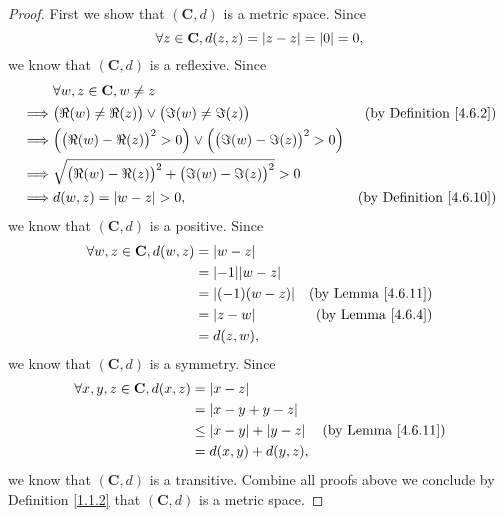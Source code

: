 \begin{proof}
    First we show that \((\mathbf{C}, d)\) is a metric space.
    Since
    \[
        \forall z \in \mathbf{C}, d(z, z) = \abs*{z - z} = \abs*{0} = 0,
    \]
    we know that \((\mathbf{C}, d)\) is a reflexive.
    Since
    \begin{align*}
                 & \forall w, z \in \mathbf{C}, w \neq z                                                                                          \\
        \implies & \big(\Re(w) \neq \Re(z)\big) \lor \big(\Im(w) \neq \Im(z)\big)                           & \text{(by Definition \ref{4.6.2})}  \\
        \implies & \Big(\big(\Re(w) - \Re(z)\big)^2 > 0\Big) \lor \Big(\big(\Im(w) - \Im(z)\big)^2 > 0\Big)                                       \\
        \implies & \sqrt{\big(\Re(w) - \Re(z)\big)^2 + \big(\Im(w) - \Im(z)\big)^2} > 0                                                           \\
        \implies & d(w, z) = \abs*{w - z} > 0,                                                              & \text{(by Definition \ref{4.6.10})}
    \end{align*}
    we know that \((\mathbf{C}, d)\) is a positive.
    Since
    \begin{align*}
        \forall w, z \in \mathbf{C}, d(w, z) & = \abs*{w - z}                                            \\
                                             & = \abs*{-1} \abs*{w - z}                                  \\
                                             & = \abs*{(-1) (w - z)}    & \text{(by Lemma \ref{4.6.11})} \\
                                             & = \abs*{z - w}           & \text{(by Lemma \ref{4.6.4})}  \\
                                             & = d(z, w),
    \end{align*}
    we know that \((\mathbf{C}, d)\) is a symmetry.
    Since
    \begin{align*}
        \forall x, y, z \in \mathbf{C}, d(x, z) & = \abs*{x - z}                                                    \\
                                                & = \abs*{x - y + y - z}                                            \\
                                                & \leq \abs*{x - y} + \abs*{y - z} & \text{(by Lemma \ref{4.6.11})} \\
                                                & = d(x, y) + d(y, z),
    \end{align*}
    we know that \((\mathbf{C}, d)\) is a transitive.
    Combine all proofs above we conclude by Definition \ref{1.1.2} that \((\mathbf{C}, d)\) is a metric space.


\end{proof}
